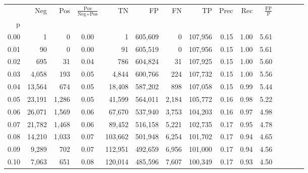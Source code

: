 \begin{tabular}{rrrcrrrrrrrrrrr}
\toprule
{} &     Neg &    Pos & $\frac{\text{Pos}}{\text{Neg}+\text{Pos}}$ &       TN &       FP &       FN &       TP &  Prec &   Rec & $\frac{\text{FP}}{\text{P}}$ \\
p    &         &        &                                            &          &          &          &          &       &       &                              \\
\midrule
0.00 &       1 &      0 &                                       0.00 &        1 &  605,609 &        0 &  107,956 &  0.15 &  1.00 &                         5.61 \\
0.01 &      90 &      0 &                                       0.00 &       91 &  605,519 &        0 &  107,956 &  0.15 &  1.00 &                         5.61 \\
0.02 &     695 &     31 &                                       0.04 &      786 &  604,824 &       31 &  107,925 &  0.15 &  1.00 &                         5.60 \\
0.03 &   4,058 &    193 &                                       0.05 &    4,844 &  600,766 &      224 &  107,732 &  0.15 &  1.00 &                         5.56 \\
0.04 &  13,564 &    674 &                                       0.05 &   18,408 &  587,202 &      898 &  107,058 &  0.15 &  0.99 &                         5.44 \\
0.05 &  23,191 &  1,286 &                                       0.05 &   41,599 &  564,011 &    2,184 &  105,772 &  0.16 &  0.98 &                         5.22 \\
0.06 &  26,071 &  1,569 &                                       0.06 &   67,670 &  537,940 &    3,753 &  104,203 &  0.16 &  0.97 &                         4.98 \\
0.07 &  21,782 &  1,468 &                                       0.06 &   89,452 &  516,158 &    5,221 &  102,735 &  0.17 &  0.95 &                         4.78 \\
0.08 &  14,210 &  1,033 &                                       0.07 &  103,662 &  501,948 &    6,254 &  101,702 &  0.17 &  0.94 &                         4.65 \\
0.09 &   9,289 &    702 &                                       0.07 &  112,951 &  492,659 &    6,956 &  101,000 &  0.17 &  0.94 &                         4.56 \\
0.10 &   7,063 &    651 &                                       0.08 &  120,014 &  485,596 &    7,607 &  100,349 &  0.17 &  0.93 &                         4.50 \\

\end{tabular}
